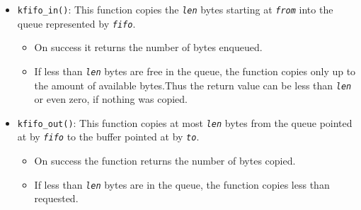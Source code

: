 \begin{itemize}
\item \texttt{kfifo_in()}: This function copies the \emph{\texttt{len}} bytes
  starting at \emph{\texttt{from}} into the queue represented by
  \emph{\texttt{fifo}}. 
  \begin{itemize}
  \item On success it returns the number of bytes enqueued.
  \item If less than \emph{\texttt{len}} bytes are free in the queue, the function copies
    only up to the amount of available bytes.Thus the return value can be less than
    \emph{\texttt{len}} or even zero, if nothing was copied.
  \end{itemize}
\item \texttt{kfifo_out()}: This function copies at most \emph{\texttt{len}} bytes
  from the queue pointed at by \emph{\texttt{fifo}} to the buffer pointed at by
  \emph{\texttt{to}}. 
  \begin{itemize}
  \item On success the function returns the number of bytes copied.
  \item If less than \emph{\texttt{len}} bytes are in the queue, the function copies less
    than requested.
  \end{itemize}
\end{itemize}




